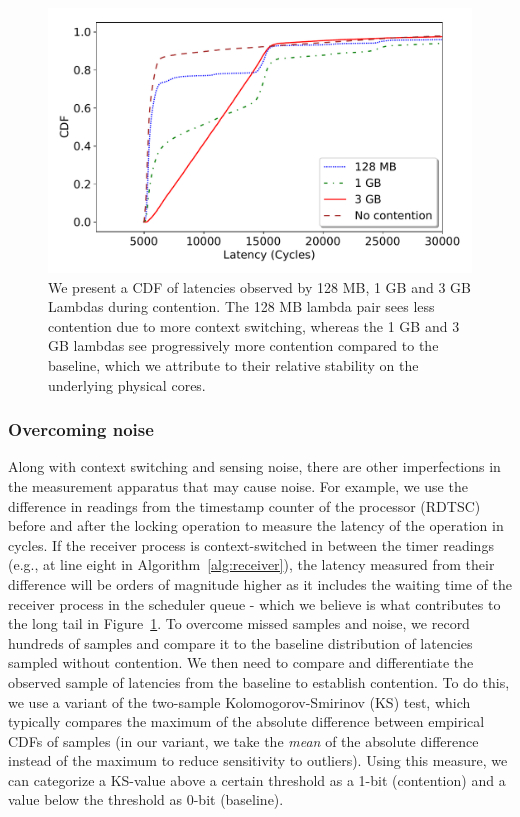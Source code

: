 \begin{figure}[!t]
  \includegraphics[width=.99\linewidth]{fig/lambda_sched_effect.pdf}
  \caption{We present a CDF of latencies observed by 128 MB, 1 GB and 3 GB
  Lambdas during contention. The 128 MB lambda pair sees less contention due to
  more context switching, whereas the 1 GB and 3 GB lambdas see progressively
  more contention compared to the baseline, which we attribute to their relative
  stability on the underlying physical cores. 
\label{fig:context_switching}}
\end{figure}

\subsubsection{Overcoming noise} 
\label{sec:method:noise}
Along with context switching and sensing noise, there are other imperfections in
the measurement apparatus that may cause noise. For example, we use the
difference in readings from the timestamp counter of the processor (RDTSC)
before and after the locking operation to measure the latency of the operation
in cycles. If the receiver process is context-switched in between the timer
readings (e.g., at line eight in Algorithm~\ref{alg:receiver}), the latency
measured from their difference will be orders of magnitude higher as it includes
the waiting time of the receiver process in the scheduler queue - which we
believe is what contributes to the long tail in
Figure~\ref{fig:context_switching}. To overcome missed samples and noise, we
record hundreds of samples and compare it to the baseline distribution of
latencies sampled without contention. We then need to compare and differentiate
the observed sample of latencies from the baseline to establish contention. To
do this, we use a variant of the two-sample Kolomogorov-Smirinov (KS) test,
which typically compares the maximum of the absolute difference between
empirical CDFs of samples (in our variant, we take the \emph{mean} of the
absolute difference instead of the maximum to reduce sensitivity to outliers). 
Using this measure, we can categorize a KS-value above a certain threshold as a 1-bit
(contention) and a value below the threshold as 0-bit (baseline).

